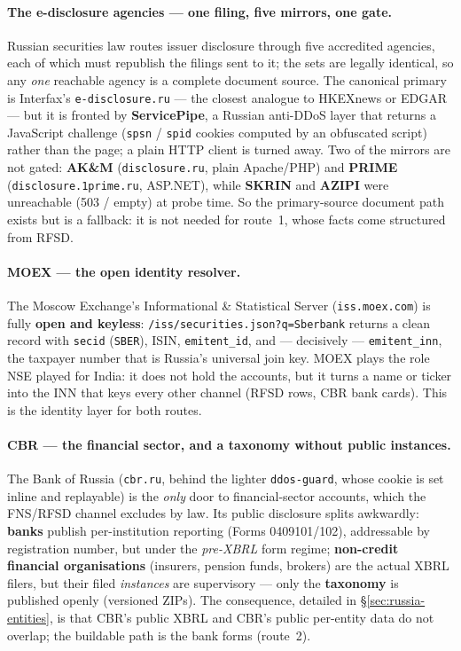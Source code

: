 \documentclass[11pt,a4paper]{report}
\begin{document}
\paragraph{The e-disclosure agencies --- one filing, five mirrors, one gate.} Russian securities law routes
issuer disclosure through five accredited agencies, each of which must republish the filings sent to it; the
sets are legally identical, so any \emph{one} reachable agency is a complete document source. The canonical
primary is Interfax's \texttt{e-disclosure.ru} --- the closest analogue to HKEXnews or EDGAR --- but it is
fronted by \textbf{ServicePipe}, a Russian anti-DDoS layer that returns a JavaScript challenge (\texttt{spsn}
/ \texttt{spid} cookies computed by an obfuscated script) rather than the page; a plain HTTP client is turned
away. Two of the mirrors are not gated: \textbf{AK\&M} (\texttt{disclosure.ru}, plain Apache/PHP) and
\textbf{PRIME} (\texttt{disclosure.1prime.ru}, ASP.NET), while \textbf{SKRIN} and \textbf{AZIPI} were
unreachable (503 / empty) at probe time. So the primary-source document path exists but is a fallback: it is
not needed for route~1, whose facts come structured from RFSD.

\paragraph{MOEX --- the open identity resolver.} The Moscow Exchange's Informational \& Statistical Server
(\texttt{iss.moex.com}) is fully \textbf{open and keyless}: \texttt{/iss/securities.json?q=Sberbank} returns
a clean record with \texttt{secid} (\texttt{SBER}), ISIN, \texttt{emitent\_id}, and --- decisively ---
\texttt{emitent\_inn}, the taxpayer number that is Russia's universal join key. MOEX plays the role NSE played
for India: it does not hold the accounts, but it turns a name or ticker into the INN that keys every other
channel (RFSD rows, CBR bank cards). This is the identity layer for both routes.

\paragraph{CBR --- the financial sector, and a taxonomy without public instances.} The Bank of Russia
(\texttt{cbr.ru}, behind the lighter \texttt{ddos-guard}, whose cookie is set inline and replayable) is the
\emph{only} door to financial-sector accounts, which the FNS/RFSD channel excludes by law. Its public
disclosure splits awkwardly: \textbf{banks} publish per-institution reporting (Forms 0409101/102),
addressable by registration number, but under the \emph{pre-XBRL} form regime; \textbf{non-credit financial
organisations} (insurers, pension funds, brokers) are the actual XBRL filers, but their filed \emph{instances}
are supervisory --- only the \textbf{taxonomy} is published openly (versioned ZIPs). The consequence, detailed
in \S\ref{sec:russia-entities}, is that CBR's public XBRL and CBR's public per-entity data do not overlap; the
buildable path is the bank forms (route~2).
\end{document}
